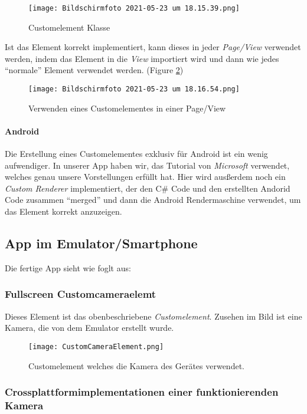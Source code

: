 \begin{figure}[h]
    \centering
    \texttt{[image: Bildschirmfoto 2021-05-23 um 18.15.39.png]}
    \caption{Customelement Klasse}
    \label{fig:CustomelementCS}
\end{figure} 

Ist das Element korrekt implementiert, kann dieses in jeder \textit{Page/View} verwendet werden, indem das Element
in die \textit{View} importiert wird und dann wie jedes ``normale'' Element verwendet werden. (Figure \ref{fig:UsingCustomElement})

\begin{figure}[h]
    \centering
    \texttt{[image: Bildschirmfoto 2021-05-23 um 18.16.54.png]}
    \caption{Verwenden eines Customelementes in einer Page/View}
    \label{fig:UsingCustomElement}
\end{figure}
\paragraph{Android} 
 Die Erstellung eines Customelementes exklusiv für Android ist ein wenig aufwendiger. In unserer App haben wir, das Tutorial von 
\textit{Microsoft} verwendet, welches genau unsere Vorstellungen erfüllt hat. Hier wird ausßerdem noch ein \textit{Custom Renderer} implementiert, der
den C\# Code und den erstellten Andorid Code zusammen ``merged'' und dann die Android Rendermaschine verwendet, um das Element korrekt anzuzeigen.

\subsection{App im Emulator/Smartphone}
Die fertige App sieht wie foglt aus:

\subsubsection{Fullscreen Customcameraelemt}
Dieses Element ist das obenbeschriebene \textit{Customelement}.
Zusehen im Bild ist eine Kamera, die von dem Emulator erstellt wurde.
\begin{figure}[h]
    \centering
    \texttt{[image: CustomCameraElement.png]}
    \caption{Customelement welches die Kamera des Gerätes verwendet.}
\end{figure}
\subsubsection{Crossplattformimplementationen einer funktionierenden Kamera}
